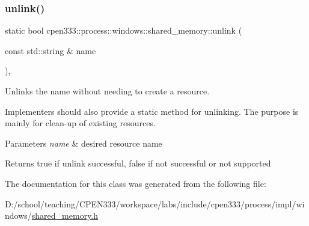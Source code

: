 \subsubsection{\texorpdfstring{unlink()}{unlink()}\hspace{0.1cm}{\footnotesize\ttfamily [2/2]}}
{\footnotesize\ttfamily static bool cpen333\+::process\+::windows\+::shared\+\_\+memory\+::unlink (\begin{DoxyParamCaption}\item[{const std\+::string \&}]{name }\end{DoxyParamCaption})\hspace{0.3cm}{\ttfamily [inline]}, {\ttfamily [static]}}



Unlinks the name without needing to create a resource. 

Implementers should also provide a static method for unlinking. The purpose is mainly for clean-\/up of existing resources.


\begin{DoxyParams}{Parameters}
{\em name} & desired resource name \\
\hline
\end{DoxyParams}
\begin{DoxyReturn}{Returns}
{\ttfamily true} if unlink successful, {\ttfamily false} if not successful or not supported 
\end{DoxyReturn}


The documentation for this class was generated from the following file\+:\begin{DoxyCompactItemize}
\item 
D\+:/school/teaching/\+C\+P\+E\+N333/workspace/labs/include/cpen333/process/impl/windows/\hyperlink{impl_2windows_2shared__memory_8h}{shared\+\_\+memory.\+h}\end{DoxyCompactItemize}
